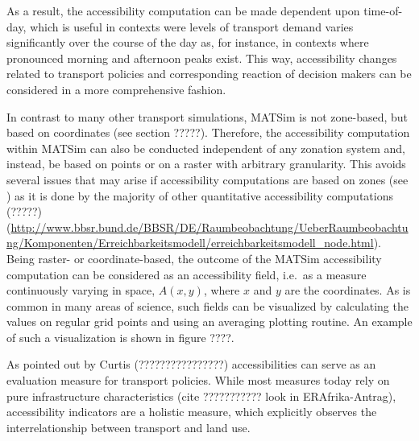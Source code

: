 As a result, the accessibility computation can be made dependent upon time-of-day, which is useful in contexts were levels of transport demand varies significantly over the course of the day as, for instance, in contexts where pronounced morning and afternoon peaks exist. This way, accessibility changes related to transport policies and corresponding reaction of decision makers can be considered in a more comprehensive fashion.

In contrast to many other transport simulations, MATSim is not zone-based, but based on coordinates (see section ?????). Therefore, the accessibility computation within MATSim can also be conducted independent of any zonation system and, instead, be based on points or on a raster with arbitrary granularity. This avoids several issues that may arise if accessibility computations are based on zones (see \citep[e.g.][]{NicolaiNagel2012HiResAccessibilityMethodInBook}) as it is done by the majority of other quantitative accessibility computations \citep[e.g.][]{Curtis, BBSR , LiuZhu2004AccessibilityAnalyst} (?????)
(\url{http://www.bbsr.bund.de/BBSR/DE/Raumbeobachtung/UeberRaumbeobachtung/Komponenten/Erreichbarkeitsmodell/erreichbarkeitsmodell_node.html}). Being raster- or coordinate-based, the outcome of the MATSim accessibility computation can be considered as an accessibility field,
i.e.\ as a measure continuously varying in space, $A(x,y)$, where $x$ and $y$
are the coordinates.  As is common in many areas of science, such
fields can be visualized by calculating the values on regular grid
points and using an averaging plotting routine. An example of such a visualization is shown in figure ????.

As pointed out by Curtis (????????????????) accessibilities can serve as an evaluation measure for transport policies. While most measures today rely on pure infrastructure characteristics (cite ??????????? look in ERAfrika-Antrag), accessibility indicators are a holistic measure, which explicitly observes the interrelationship between transport and land use.

